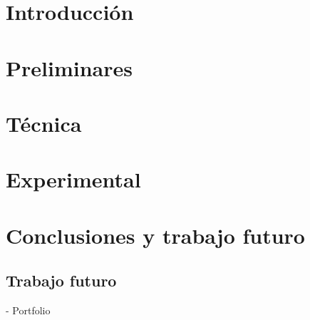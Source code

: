 \documentclass[a4paper, 11pt, twoside]{tesis}
\begin{document}
\def\autor{Ignacio Vissani}
\def\titulo{Acelerando ParAlloy mediante la reutilización de cláusulas
aprendidas} 
\def\runtitulo{Acelerando ParAlloy mediante la reutilización de cláusulas
aprendidas}
\def\runtitle{Speeding up ParAlloy reusing learnt clauses}
\def\director{Carlos Gustavo López Pombo}
\def\codirector{Nicolás Leandro Rosner}
\def\lugar{Buenos Aires, 2012}


\frontmatter
\pagestyle{empty}


\cleardoublepage


\cleardoublepage

\cleardoublepage

\cleardoublepage
\tableofcontents

\mainmatter
\pagestyle{headings}

\theoremstyle{definition}
\newtheorem{definition}{Definición}[section]

\newcommand{\true}{\texttt{TRUE}\xspace}
\newcommand{\false}{\texttt{FALSE}\xspace}
\newcommand{\sat}{\emph{sat}\xspace}
\newcommand{\unsat}{\emph{unsat}\xspace}
\newcommand{\cnf}{\texttt{\textbf{CNF}}\xspace}
\newcommand{\npc}{\textbf{NP-Complete}\xspace}
\newcommand{\bt}{\emph{backtracking}\xspace}

\newcommand{\soft}{\emph{software}\xspace}
\newcommand{\hard}{\emph{hardware}\xspace}

\newcommand{\defname}[1]{\textbf{\emph{[#1]}}}

\listoftodos

\chapter{Introducción}




\chapter{Preliminares}



\chapter{Técnica}



\chapter{Experimental}

\chapter{Conclusiones y trabajo futuro}

\section{Trabajo futuro}
- Portfolio

{}

\end{document}
